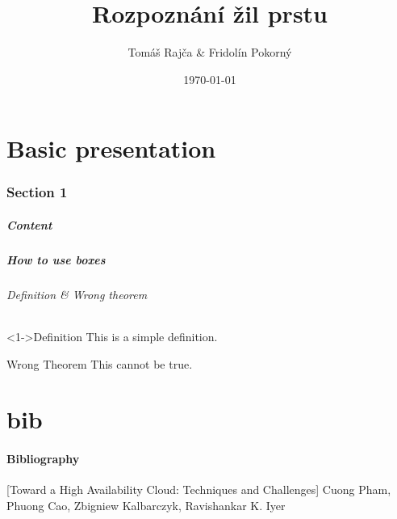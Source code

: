 \documentclass[compress]{beamer}
\begin{document}
\title{Rozpoznání žil prstu}
\author{Tomáš Rajča \& Fridolín Pokorný}
\date{\today}


\begin{frame}[plain]
  \titlepage
\end{frame}

\part{Basic presentation}
\frame{\partpage}

\section{Section 1}

\begin{frame}
  \frametitle{Content}
  \tableofcontents
\end{frame}


\begin{frame}
  \frametitle{How to use boxes}
  \framesubtitle{Definition \& Wrong theorem}

  \begin{block}<1->{Definition}
    This is a simple definition.
  \end{block}

  \begin{alertblock}{Wrong Theorem}
    This \alert{cannot} be true.
  \end{alertblock}
\end{frame}


\part{bib}
\subsection{Bibliography}
\begin{frame}
\begin{thebibliography}{10}
  [Toward a High Availability Cloud: Techniques and Challenges]
  \newblock Cuong Pham, Phuong Cao, Zbigniew Kalbarczyk, Ravishankar K. Iyer

\end{thebibliography}
\end{frame}
\end{document}
